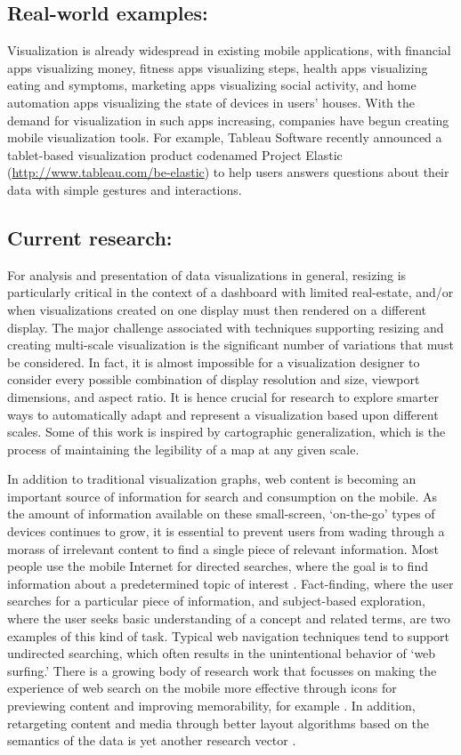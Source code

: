 \documentclass{sigchi-ext}
\begin{document}
\subsection{Real-world examples:} Visualization is already widespread in existing mobile applications, with financial apps visualizing money, fitness apps visualizing steps, health apps visualizing eating and symptoms, marketing apps visualizing social activity, and home automation apps visualizing the state of devices in users' houses. With the demand for visualization in such apps increasing, companies have begun creating mobile visualization tools. For example, Tableau Software recently announced a tablet-based visualization product codenamed Project Elastic (\url{http://www.tableau.com/be-elastic}) to help users answers questions about their data with simple gestures and interactions.

\subsection{Current research:} For analysis and presentation of data visualizations in general, resizing is particularly critical in the context of a dashboard with limited real-estate, and/or when visualizations created on one display must then rendered on a different display. The major challenge associated with techniques supporting resizing and creating multi-scale visualization is the significant number of variations that must be considered. In fact, it is almost impossible for a visualization designer to consider every possible combination of display resolution and size, viewport dimensions, and aspect ratio. It is hence crucial for research to explore smarter ways to automatically adapt and represent a visualization based upon different scales. Some of this work is inspired by cartographic generalization, which is the process of maintaining the legibility of a map at any given scale. 

In addition to traditional visualization graphs, web content is becoming an important source of information for search and consumption on the mobile. As the amount of information available on these small-screen, `on-the-go' types of devices continues to grow, it is essential to prevent users from wading through a morass of irrelevant content to find a single piece of relevant information. Most people use the mobile Internet for directed searches, where the goal is to find information about a predetermined topic of interest \cite{Setlur:2011}. Fact-finding, where the user searches for a particular piece of information, and subject-based exploration, where the user seeks basic understanding of a concept and related terms, are two examples of this kind of task. Typical web navigation techniques tend to support undirected searching, which often results in the unintentional behavior of `web surfing.' There is a growing body of research work that focusses on making the experience of web search on the mobile more effective through icons for previewing content and improving memorability, for example \cite{Setlur:SVM:2005}. In addition, retargeting content and media through better layout algorithms based on the semantics of the data is yet another research vector \cite{Setlur2007}.
\end{document}
